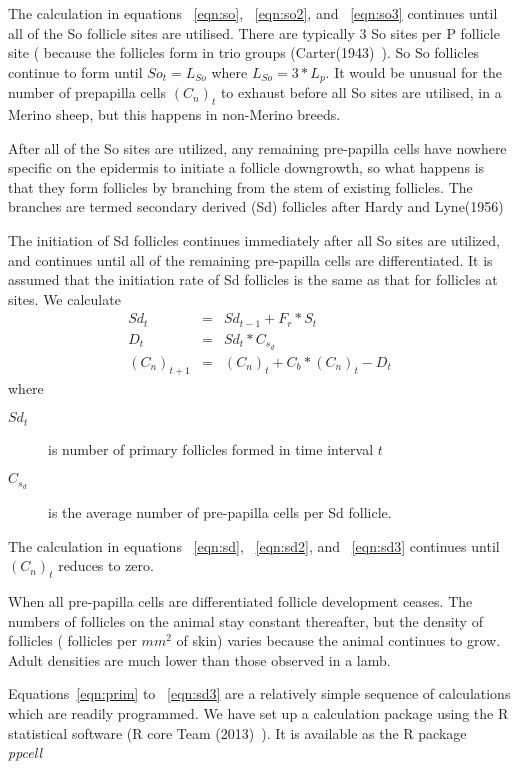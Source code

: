 \documentclass[titlepage]{article}  %
\begin{document}
The calculation in equations ~\ref{eqn:so}, ~\ref{eqn:so2}, and ~\ref{eqn:so3} continues until all of the So follicle sites are utilised. There are typically 3 So sites per P follicle site ( because the follicles form in trio groups (Carter(1943)~\cite{cart:43}). So So follicles continue to form until $ So_{t} = L_{So} $  where $L_{So} = 3 * L_{p} $. It would be unusual for the number of prepapilla cells $(C_{n})_{t}$ to exhaust before all So sites are utilised, in a Merino sheep, but this happens in non-Merino breeds. 

After all of the So sites are utilized, any remaining pre-papilla cells have nowhere specific on the epidermis to initiate a follicle downgrowth, so what happens is that they form follicles by branching from the stem of existing follicles. The branches are termed secondary derived (Sd) follicles after Hardy and Lyne(1956)~\cite{hard:56}

The initiation of Sd follicles continues immediately after all So sites are utilized, and continues until all of the remaining pre-papilla cells are differentiated. It is assumed that the initiation rate of Sd follicles is the same as that for follicles at sites. We calculate
\begin{eqnarray}
\label{eqn:sd}
Sd_{t} & = & Sd_{t-1} +  F_{r} * S_{t} \\
\label{eqn:sd2}
D_{t} & = & Sd_{t} * C_{s_{d}} \\
\label{eqn:sd3}
(C_{n})_{t+1} & = & (C_{n})_{t} + C_{b} * (C_{n})_{t} - D_{t}
\end{eqnarray}
where
\begin{description}
\item[$Sd_{t}$] is number of primary follicles formed in time interval $t$
\item[$C_{s_{d}}$] is the average number of pre-papilla cells per Sd follicle.
\end{description}
 
The calculation in equations ~\ref{eqn:sd}, ~\ref{eqn:sd2}, and ~\ref{eqn:sd3} continues until $(C_{n})_{t}$ reduces to zero.

When all pre-papilla cells are differentiated follicle development ceases. The numbers of follicles on the animal stay constant thereafter, but the density of follicles ( follicles per $mm^{2}$ of skin) varies because the animal continues to grow.  Adult densities are much lower than those observed in a lamb.

Equations~\ref{eqn:prim} to ~\ref{eqn:sd3} are a relatively simple sequence of calculations which are readily programmed. We have set up a calculation package using the R statistical software (R core Team (2013)~\cite{rprog:13}). It is available as the R package {\em ppcell}~\cite{jack:18} 
\end{document}

